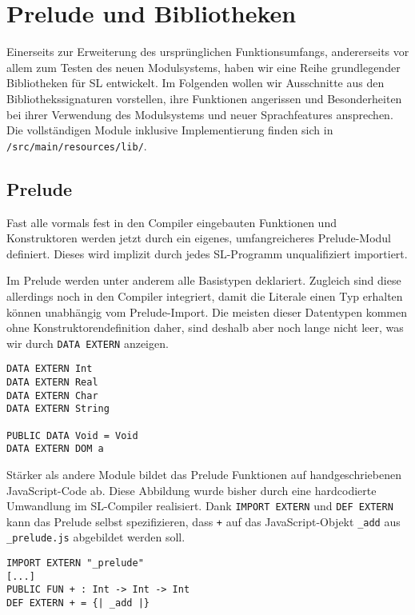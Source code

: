 \documentclass[runningheads]{llncs}
\begin{document}
\section{Prelude und Bibliotheken}
\label{sec:libs}

Einerseits zur Erweiterung des ursprünglichen Funktionsumfangs, andererseits
vor allem zum Testen des neuen Modulsystems, haben wir eine Reihe grundlegender
Bibliotheken für SL entwickelt. Im Folgenden wollen wir Ausschnitte aus den
Bibliothekssignaturen vorstellen, ihre Funktionen angerissen und
Besonderheiten bei ihrer Verwendung des Modulsystems und neuer Sprachfeatures
ansprechen. Die vollständigen Module inklusive Implementierung finden sich
in \verb|/src/main/resources/lib/|.

\subsection{Prelude}
\label{sec:libsPrelude}

Fast alle vormals fest in den Compiler eingebauten Funktionen und Konstruktoren
werden jetzt durch ein eigenes, umfangreicheres Prelude-Modul definiert.
Dieses wird implizit durch jedes SL-Programm unqualifiziert importiert.

Im Prelude werden unter anderem alle Basistypen deklariert. Zugleich sind
diese allerdings noch in den Compiler integriert, damit die Literale einen
Typ erhalten können unabhängig vom Prelude-Import. Die meisten dieser
Datentypen kommen ohne Konstruktorendefinition daher, sind deshalb aber noch
lange nicht leer, was wir durch \verb|DATA EXTERN| anzeigen.

\begin{verbatim}
DATA EXTERN Int
DATA EXTERN Real
DATA EXTERN Char
DATA EXTERN String

PUBLIC DATA Void = Void
DATA EXTERN DOM a
\end{verbatim}

Stärker als andere Module bildet das Prelude Funktionen auf handgeschriebenen
JavaScript-Code ab. Diese Abbildung wurde bisher durch eine hardcodierte
Umwandlung im SL-Compiler realisiert. Dank \verb|IMPORT EXTERN| und
\verb|DEF EXTERN| kann das Prelude selbst spezifizieren, dass \verb|+| auf das
JavaScript-Objekt \verb|_add| aus \verb|_prelude.js| abgebildet werden soll.

\begin{verbatim}
IMPORT EXTERN "_prelude" 
[...]
PUBLIC FUN + : Int -> Int -> Int
DEF EXTERN + = {| _add |}
\end{verbatim}
\end{document}
